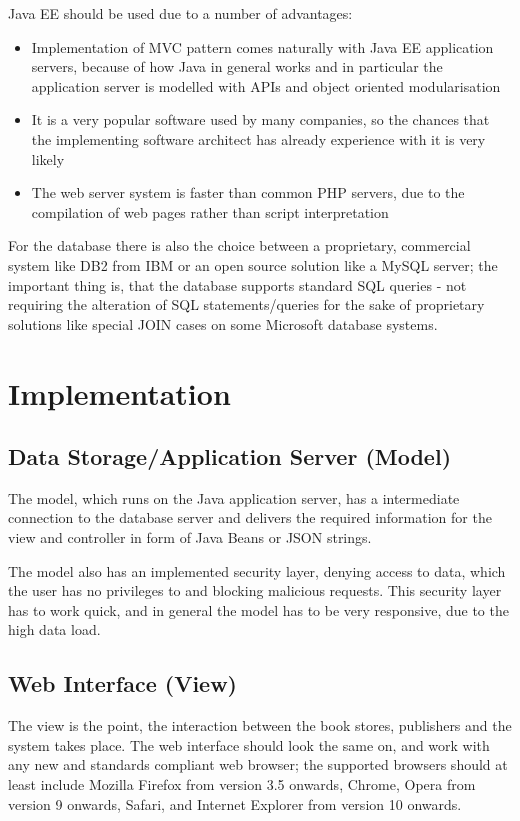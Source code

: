 \documentclass[11pt,a4paper,oneside,svgnames]{report}
\begin{document}
Java EE should be used due to a number of advantages:
\begin{itemize}
	\item Implementation of MVC pattern comes naturally with Java EE application servers, because of how Java in general works and in particular the application server is modelled with APIs and object oriented modularisation
	\item It is a very popular software used by many companies, so the chances that the implementing software architect has already experience with it is very likely
	\item The web server system is faster than common PHP servers, due to the compilation of web pages rather than script interpretation
\end{itemize}

For the database there is also the choice between a proprietary, commercial system like DB2 from IBM or an open source solution like a MySQL server; the important thing is, that the database supports standard SQL queries - not requiring the alteration of SQL statements/queries for the sake of proprietary solutions like special JOIN cases on some Microsoft database systems.

\section{Implementation}
\subsection{Data Storage/Application Server (Model)}
The model, which runs on the Java application server, has a intermediate connection to the database server and delivers the required information for the view and controller in form of Java Beans or JSON strings.

The model also has an implemented security layer, denying access to data, which the user has no privileges to and blocking malicious requests. This security layer has to work quick, and in general the model has to be very responsive, due to the high data load.

\subsection{Web Interface (View)}
The view is the point, the interaction between the book stores, publishers and the system takes place. The web interface should look the same on, and work with any new and standards compliant web browser; the supported browsers should at least include Mozilla Firefox from version 3.5 onwards, Chrome, Opera from version 9 onwards, Safari, and Internet Explorer from version 10 onwards.
\end{document}
